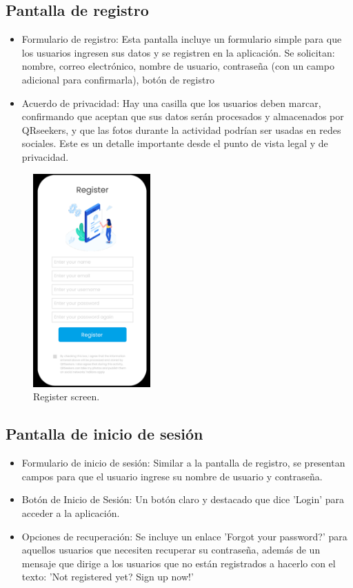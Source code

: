 \documentclass[letterpaper, 12pt]{report}
\begin{document}
\subsection{Pantalla de registro}

\begin{itemize}
    \item Formulario de registro: Esta pantalla incluye un formulario simple para que los usuarios ingresen sus datos y se registren en la aplicación. Se solicitan: nombre, correo electrónico, nombre de usuario, contraseña (con un campo adicional para confirmarla), botón de registro
    \item Acuerdo de privacidad: Hay una casilla que los usuarios deben marcar, confirmando que aceptan que sus datos serán procesados y almacenados por QRseekers, y que las fotos durante la actividad podrían ser usadas en redes sociales. Este es un detalle importante desde el punto de vista legal y de privacidad.
\end{itemize}

\begin{figure}[H]
\centering
\includegraphics[width=0.4\textwidth]{figure2.png}
\caption{Register screen.}
\label{fig:1}
\end{figure}

\subsection{Pantalla de inicio de sesión}

\begin{itemize}
    \item Formulario de inicio de sesión: Similar a la pantalla de registro, se presentan campos para que el usuario ingrese su nombre de usuario y contraseña.
    \item Botón de Inicio de Sesión: Un botón claro y destacado que dice 'Login' para acceder a la aplicación.
    \item Opciones de recuperación: Se incluye un enlace 'Forgot your password?' para aquellos usuarios que necesiten recuperar su contraseña, además de un mensaje que dirige a los usuarios que no están registrados a hacerlo con el texto: 'Not registered yet? Sign up now!'
\end{itemize}
\end{document}
